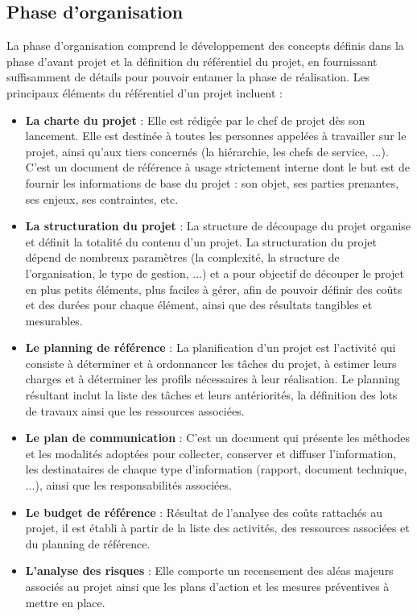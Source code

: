 \begin{spacing}{1.5}
\subsection{Phase d'organisation}
La phase d'organisation comprend le développement des concepts définis dans la phase d'avant projet et la définition du référentiel du projet, en fournissant suffisamment de détails pour pouvoir entamer la phase de réalisation. Les principaux éléments du référentiel d'un projet incluent :
\begin{itemize}
    \item \textbf{La charte du projet} : Elle est rédigée par le chef de projet dès son lancement. Elle est destinée à toutes les personnes appelées à travailler sur le projet, ainsi qu'aux tiers concernés (la hiérarchie, les chefs de service, ...). C'est un document de référence à usage strictement interne dont le but est de fournir les informations de base du projet : son objet, ses parties prenantes, ses enjeux, ses contraintes, etc.
    \item \textbf{La structuration du projet} : La structure de découpage du projet organise et définit la totalité du contenu d'un projet. La structuration du projet dépend de nombreux paramètres (la complexité, la structure de l'organisation, le type de gestion, ...) et a pour objectif de découper le projet en plus petits éléments, plus faciles à gérer, afin de pouvoir définir des coûts et des durées pour chaque élément, ainsi que des résultats tangibles et mesurables.
    \item \textbf{Le planning de référence} : La planification d'un projet est l’activité qui consiste à déterminer et à ordonnancer les tâches du projet, à estimer leurs charges et à déterminer les profils nécessaires à leur réalisation. Le planning résultant inclut la liste des tâches et leurs antériorités, la définition des lots de travaux ainsi que les ressources associées.
    \item \textbf{Le plan de communication} : C'est un document qui présente les méthodes et les modalités adoptées pour collecter, conserver et diffuser l'information, les destinataires de chaque type d'information (rapport, document technique, ...), ainsi que les responsabilités associées.
    \item \textbf{Le budget de référence} : Résultat de l'analyse des coûts rattachés au projet, il est établi à partir de la liste des activités, des ressources associées et du planning de référence.
    \item \textbf{L'analyse des risques} : Elle comporte un recensement des aléas majeurs associés au projet ainsi que les plans d'action et les mesures préventives à mettre en place.
\end{itemize}


\end{spacing}
